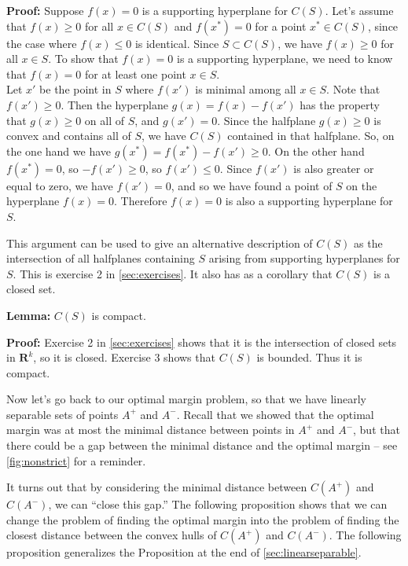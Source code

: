 \documentclass[
  oneside]{scrbook}
\begin{document}
\textbf{Proof:} Suppose \(f(x)=0\) is a supporting hyperplane for
\(C(S)\). Let's assume that \(f(x)\ge 0\) for all \(x\in C(S)\) and
\(f(x^{*})=0\) for a point \(x^{*}\in C(S)\), since the case where
\(f(x)\le 0\) is identical. Since \(S\subset C(S)\), we have
\(f(x)\ge 0\) for all \(x\in S\). To show that \(f(x)=0\) is a
supporting hyperplane, we need to know that \(f(x)=0\) for at least one
point \(x\in S\).\\
Let \(x'\) be the point in \(S\) where \(f(x')\) is minimal among all
\(x\in S\). Note that \(f(x')\ge 0\). Then the hyperplane
\(g(x) = f(x)-f(x')\) has the property that \(g(x)\ge 0\) on all of
\(S\), and \(g(x')=0\). Since the halfplane \(g(x)\ge 0\) is convex and
contains all of \(S\), we have \(C(S)\) contained in that halfplane. So,
on the one hand we have \(g(x^{*})=f(x^{*})-f(x')\ge 0\). On the other
hand \(f(x^{*})=0\), so \(-f(x')\ge 0\), so \(f(x')\le 0\). Since
\(f(x')\) is also greater or equal to zero, we have \(f(x')=0\), and so
we have found a point of \(S\) on the hyperplane \(f(x)=0\). Therefore
\(f(x)=0\) is also a supporting hyperplane for \(S\).

This argument can be used to give an alternative description of \(C(S)\)
as the intersection of all halfplanes containing \(S\) arising from
supporting hyperplanes for \(S\). This is exercise 2 in
\cref{sec:exercises}. It also has as a corollary that \(C(S)\) is a
closed set.

\textbf{Lemma:} \(C(S)\) is compact.

\textbf{Proof:} Exercise 2 in \cref{sec:exercises} shows that it is the
intersection of closed sets in \(\mathbf{R}^{k}\), so it is closed.
Exercise 3 shows that \(C(S)\) is bounded. Thus it is compact.

Now let's go back to our optimal margin problem, so that we have
linearly separable sets of points \(A^{+}\) and \(A^{-}\). Recall that
we showed that the optimal margin was at most the minimal distance
between points in \(A^{+}\) and \(A^{-}\), but that there could be a gap
between the minimal distance and the optimal margin -- see
\cref{fig:nonstrict} for a reminder.

It turns out that by considering the minimal distance between
\(C(A^{+})\) and \(C(A^{-})\), we can ``close this gap.'' The following
proposition shows that we can change the problem of finding the optimal
margin into the problem of finding the closest distance between the
convex hulls of \(C(A^{+})\) and \(C(A^{-})\). The following proposition
generalizes the Proposition at the end of \cref{sec:linearseparable}.
\end{document}
